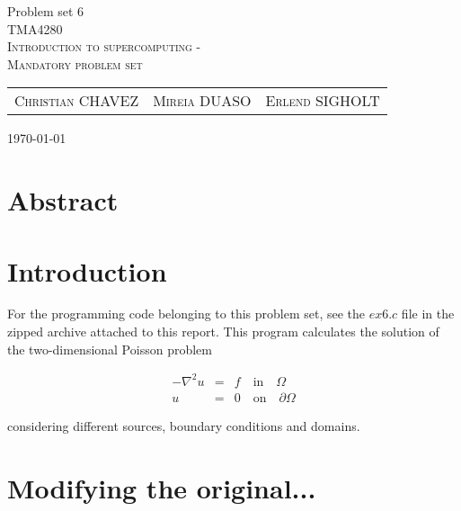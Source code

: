 \documentclass[fontsize=11pt,paper=a4,titlepage]{report}
\begin{document}
\begin{center}


{\huge Problem set 6}\\[0.5cm]

\textsc{\LARGE TMA4280}\\[0.5cm]
\textsc{\large Introduction to supercomputing -}\\
\textsc{\large Mandatory problem set}\\[0.6cm]

\begin{table}[h]
\centering
\begin{tabular}{ccc}
	\textsc{Christian CHAVEZ} & \textsc{Mireia DUASO} & \textsc{Erlend SIGHOLT}
\end{tabular}
\end{table}

\large{\today}
\vfill
\section*{Abstract}
\end{center}


\addtocounter{chapter}{1}

\clearpage
\section{Introduction}

For the programming code belonging to this problem set, see the $\textit{ex6.c}$
file in the zipped archive attached to this report. This program calculates the
solution of the two-dimensional Poisson problem

\begin{eqnarray}
	-\nabla^2 u & = & f \quad \textrm{in} \quad \Omega \\
	u & = & 0 \quad \textrm{on} \quad \partial\Omega
	\label{eq:Poisson}
\end{eqnarray}

considering different sources, boundary conditions and domains.



\section{Modifying the original...}
\end{document}
